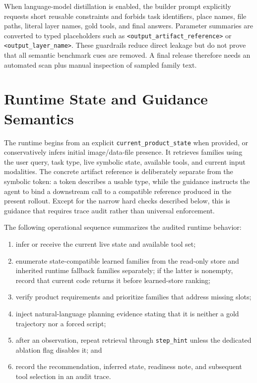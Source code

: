 \documentclass[10pt]{article}
\begin{document}
When language-model distillation is enabled, the builder prompt explicitly requests short reusable constraints and forbids task identifiers, place names, file paths, literal layer names, gold tools, and final answers. Parameter summaries are converted to typed placeholders such as \texttt{<output\_artifact\_reference>} or \texttt{<output\_layer\_name>}. These guardrails reduce direct leakage but do not prove that all semantic benchmark cues are removed. A final release therefore needs an automated scan plus manual inspection of sampled family text.

\section{Runtime State and Guidance Semantics}
The runtime begins from an explicit \texttt{current\_product\_state} when provided, or conservatively infers initial image/data-file presence. It retrieves families using the user query, task type, live symbolic state, available tools, and current input modalities. The concrete artifact reference is deliberately separate from the symbolic token: a token describes a usable type, while the guidance instructs the agent to bind a downstream call to a compatible reference produced in the present rollout. Except for the narrow hard checks described below, this is guidance that requires trace audit rather than universal enforcement.

The following operational sequence summarizes the audited runtime behavior:
\begin{enumerate}
\item infer or receive the current live state and available tool set;
\item enumerate state-compatible learned families from the read-only store and inherited runtime fallback families separately; if the latter is nonempty, record that current code returns it before learned-store ranking;
\item verify product requirements and prioritize families that address missing slots;
\item inject natural-language planning evidence stating that it is neither a gold trajectory nor a forced script;
\item after an observation, repeat retrieval through \texttt{step\_hint} unless the dedicated ablation flag disables it; and
\item record the recommendation, inferred state, readiness note, and subsequent tool selection in an audit trace.
\end{enumerate}
\end{document}
